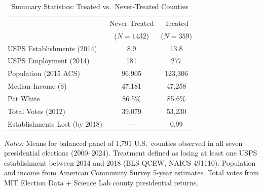 \begin{table}[htbp]
\centering
\caption{Summary Statistics: Treated vs.\ Never-Treated Counties}
\label{tab:summary}
\begin{tabular}{lcc}
\hline\hline
 & Never-Treated & Treated \\
 & ($N = 1432$) & ($N = 359$) \\
\hline
USPS Establishments (2014) & 8.9 & 13.8 \\
USPS Employment (2014) & 181 & 277 \\
Population (2015 ACS) & 96,905 & 123,306 \\
Median Income (\$) & 47,181 & 47,258 \\
Pct White & 86.5\% & 85.6\% \\
Total Votes (2012) & 39,079 & 53,230 \\
Establishments Lost (by 2018) & --- & 0.99 \\
\hline\hline
\end{tabular}
\begin{tablenotes}
\small
\item \textit{Notes:} Means for balanced panel of 1,791 U.S.\ counties observed in all seven presidential elections (2000--2024). Treatment defined as losing at least one USPS establishment between 2014 and 2018 (BLS QCEW, NAICS 491110). Population and income from American Community Survey 5-year estimates. Total votes from MIT Election Data + Science Lab county presidential returns.
\end{tablenotes}
\end{table}
